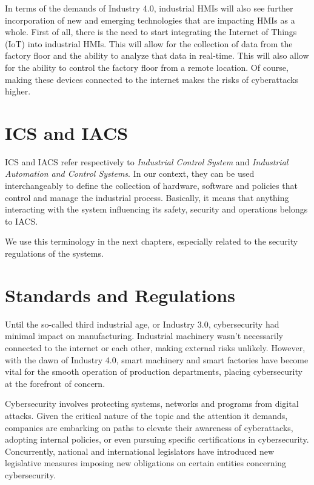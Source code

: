 In terms of the demands of Industry 4.0, industrial HMIs will also see further incorporation of new and emerging technologies that are impacting HMIs as a whole. First of all, there is the need to start integrating the Internet of Things (IoT) into industrial HMIs. This will allow for the collection of data from the factory floor and the ability to analyze that data in real-time. This will also allow for the ability to control the factory floor from a remote location. Of course, making these devices connected to the internet makes the risks of cyberattacks higher.

\section{ICS and IACS}

ICS and IACS refer respectively to \textit{Industrial Control System} and \textit{Industrial Automation and Control Systems}. In our context, they can be used interchangeably to define the collection of hardware, software and policies that control and manage the industrial process. Basically, it means that anything interacting with the system influencing its safety, security and operations belongs to IACS.~\cite{ics-or-iacs}

We use this terminology in the next chapters, especially related to the security regulations of the systems.

\section{Standards and Regulations}
Until the so-called third industrial age, or Industry 3.0, cybersecurity had minimal impact on manufacturing. Industrial machinery wasn't necessarily connected to the internet or each other, making external risks unlikely. However, with the dawn of Industry 4.0, smart machinery and smart factories have become vital for the smooth operation of production departments, placing cybersecurity at the forefront of concern.

Cybersecurity involves protecting systems, networks and programs from digital attacks. Given the critical nature of the topic and the attention it demands, companies are embarking on paths to elevate their awareness of cyberattacks, adopting internal policies, or even pursuing specific certifications in cybersecurity. Concurrently, national and international legislators have introduced new legislative measures imposing new obligations on certain entities concerning cybersecurity.

